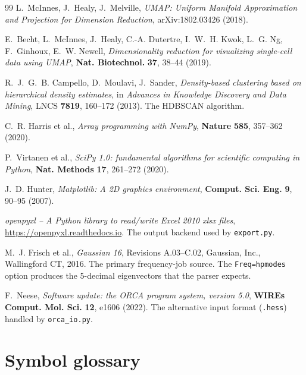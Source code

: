 \documentclass[10pt,a4paper,twoside]{article}
\newcommand{\fn}[1]{\texttt{#1}}
\newcommand{\file}[1]{\texttt{#1}}
\begin{document}
\begin{thebibliography}{99}
L.~McInnes, J.~Healy, J.~Melville,
\emph{UMAP: Uniform Manifold Approximation and Projection for
Dimension Reduction}, arXiv:1802.03426 (2018).

E.~Becht, L.~McInnes, J.~Healy, C.-A. Dutertre, I.~W.~H. Kwok,
L.~G. Ng, F.~Ginhoux, E.~W. Newell,
\emph{Dimensionality reduction for visualizing single-cell data
using UMAP},
\textbf{Nat. Biotechnol.} \textbf{37}, 38--44 (2019).

R.~J.~G.~B. Campello, D.~Moulavi, J.~Sander,
\emph{Density-based clustering based on hierarchical density
estimates},
in \emph{Advances in Knowledge Discovery and Data Mining},
LNCS \textbf{7819}, 160--172 (2013).
The HDBSCAN algorithm.

C.~R. Harris et al.,
\emph{Array programming with NumPy},
\textbf{Nature} \textbf{585}, 357--362 (2020).

P.~Virtanen et al.,
\emph{SciPy 1.0: fundamental algorithms for scientific computing
in Python},
\textbf{Nat. Methods} \textbf{17}, 261--272 (2020).

J.~D. Hunter,
\emph{Matplotlib: A 2D graphics environment},
\textbf{Comput. Sci. Eng.} \textbf{9}, 90--95 (2007).

\emph{openpyxl -- A Python library to read/write Excel 2010 xlsx
files}, \url{https://openpyxl.readthedocs.io}.
The output backend used by \fn{export.py}.

M.~J. Frisch et al.,
\emph{Gaussian 16}, Revisions A.03--C.02,
Gaussian, Inc., Wallingford CT, 2016.
The primary frequency-job source. The \texttt{Freq=hpmodes} option
produces the 5-decimal eigenvectors that the parser expects.

F.~Neese,
\emph{Software update: the ORCA program system, version 5.0},
\textbf{WIREs Comput. Mol. Sci.} \textbf{12}, e1606 (2022).
The alternative input format (\file{.hess}) handled by
\file{orca\_io.py}.

\end{thebibliography}

\section*{Symbol glossary}
\end{document}
